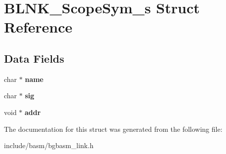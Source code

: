 \hypertarget{structBLNK__ScopeSym__s}{\section{B\-L\-N\-K\-\_\-\-Scope\-Sym\-\_\-s Struct Reference}
\label{structBLNK__ScopeSym__s}
}
\subsection*{Data Fields}
\begin{DoxyCompactItemize}
\item 
\hypertarget{structBLNK__ScopeSym__s_a3f926c421e6aaa15d001209ec7a6ac98}{char $\ast$ {\bfseries name}}\label{structBLNK__ScopeSym__s_a3f926c421e6aaa15d001209ec7a6ac98}

\item 
\hypertarget{structBLNK__ScopeSym__s_a3dc2cd23e3929c09df92ff0df5d8e37e}{char $\ast$ {\bfseries sig}}\label{structBLNK__ScopeSym__s_a3dc2cd23e3929c09df92ff0df5d8e37e}

\item 
\hypertarget{structBLNK__ScopeSym__s_a7dadf933b197d4617734b5fe858940eb}{void $\ast$ {\bfseries addr}}\label{structBLNK__ScopeSym__s_a7dadf933b197d4617734b5fe858940eb}

\end{DoxyCompactItemize}


The documentation for this struct was generated from the following file\-:\begin{DoxyCompactItemize}
\item 
include/basm/bgbasm\-\_\-link.\-h\end{DoxyCompactItemize}
